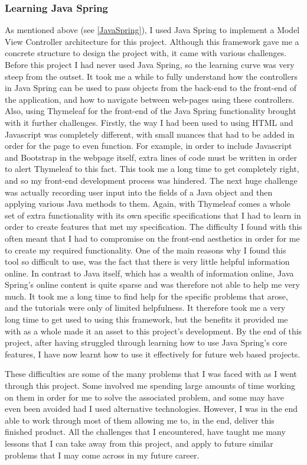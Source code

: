 \subsubsection{Learning Java Spring}
As mentioned above (see \ref{JavaSpring}), I used Java Spring to implement a Model View Controller architecture for this project. Although this framework gave me a concrete structure to design the project with, it came with various challenges. Before this project I had never used Java Spring, so the learning curve was very steep from the outset. It took me a while to fully understand how the controllers in Java Spring can be used to pass objects from the back-end to the front-end of the application, and how to navigate between web-pages using these controllers. Also, using Thymeleaf for the front-end of the Java Spring functionality brought with it further challenges. Firstly, the way I had been used to using HTML and Javascript was completely different, with small nuances that had to be added in order for the page to even function. For example, in order to include Javascript and Bootstrap in the webpage itself, extra lines of code must be written in order to alert Thymeleaf to this fact. This took me a long time to get completely right, and so my front-end development process was hindered. The next huge challenge was actually recording user input into the fields of a Java object and then applying various Java methods to them. Again, with Thymeleaf comes a whole set of extra functionality with its own specific specifications that I had to learn in order to create features that met my specification. The difficulty I found with this often meant that I had to compromise on the front-end aesthetics in order for me to create my required functionality. One of the main reasons why I found this tool so difficult to use, was the fact that there is very little helpful information online. In contrast to Java itself, which has a wealth of information online, Java Spring's online content is quite sparse and was therefore not able to help me very much. It took me a long time to find help for the specific problems that arose, and the tutorials were only of limited helpfulness. It therefore took me a very long time to get used to using this framework, but the benefits it provided me with as a whole made it an asset to this project's development. By the end of this project, after having struggled through learning how to use Java Spring's core features, I have now learnt how to use it effectively for future web based projects.

These difficulties are some of the many problems that I was faced with as I went through this project. Some involved me spending large amounts of time working on them in order for me to solve the associated problem, and some may have even been avoided had I used alternative technologies. However, I was in the end able to work through most of them allowing me to, in the end, deliver this finished product. All the challenges that I encountered, have taught me many lessons that I can take away from this project, and apply to future similar problems that I may come across in my future career. 

